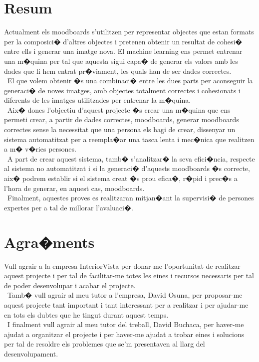 \documentclass[12pt,a4paper,openright,oneside]{article}
\numberwithin{equation}{section}
\theoremstyle{definition}
\begin{document}
\section*{Resum}
Actualment els moodboards s'utilitzen per representar objectes que estan formats per la composici� d'altres objectes i pretenen obtenir un resultat de cohesi� entre ells i generar una imatge nova.
El machine learning ens permet entrenar una m�quina per tal que aquesta sigui capa� de generar els valors amb les dades que li hem entrat pr�viament, les quals han de ser dades correctes.
\\\
El que volem obtenir �s una combinaci� entre les dues parts per aconseguir la generaci� de noves imatges, amb objectes totalment correctes i cohesionats i diferents de les imatges utilitzades per entrenar la m�quina.
\\\
Aix� doncs l'objectiu d'aquest projecte �s crear una m�quina que ens permeti crear, a partir de dades correctes, moodboards, generar moodboards correctes sense la necessitat que una persona els hagi de crear, dissenyar un sistema automatitzat per a reempla�ar una tasca lenta i mec�nica que realitzen a m� v�ries persones.
\\\
A part de crear aquest sistema, tamb� s'analitzar� la seva efici�ncia, respecte al sistema no automatitzat i si la generaci� d'aquests moodboards �s correcte, aix� podrem establir si el sistema creat �s prou efica�, r�pid i prec�s a l'hora de generar, en aquest cas, moodboards.
\\\
Finalment, aquestes proves es realitzaran mitjan�ant la supervisi� de persones expertes per a tal de millorar l'avaluaci�. 
\newpage 


\section*{Agra�ments}

Vull agrair a la empresa InteriorVista per donar-me l'oportunitat de realitzar aquest projecte i per tal de facilitar-me totes les eines i recursos necessaris per tal de poder desenvolupar i acabar el projecte.\\\
Tamb� vull agrair al meu tutor a l'empresa, David Osuna, per proposar-me aquest projecte tant important i tant interessant per a realitzar i per ajudar-me en tots els dubtes que he tingut durant aquest temps.\\\
I finalment vull agrair al meu tutor del treball, David Buchaca, per haver-me ajudat  a organitzar el projecte i per haver-me ajudat a trobar eines i solucions per tal de resoldre els problemes que se'm presentaven al llarg del desenvolupament.
\newpage
\end{document}
